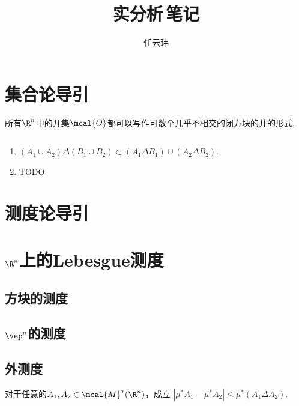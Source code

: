 

\title{实分析$\,$笔记}
\author{任云玮}
\date{}



\maketitle
\tableofcontents
\newpage

\section{集合论导引}

  \begin{thm}
    \label{thm: 开集的闭方块表示}
    所有$\R^n$中的开集$\mcal{O}$都可以写作可数个几乎不相交的闭方块的并的形式.
  \end{thm}

  \begin{pos}[对称差]
    \label{pos: 对称差}
    $\,$
    \begin{enumerate}
      \item $(A_1\cup A_2)\Delta(B_1\cup B_2)\subset(A_1\Delta B_1)\cup(A_2\Delta B_2)$.
      \item TODO
    \end{enumerate}
  \end{pos}

\newpage
\section{测度论导引}

\newpage
\section{$\R^n$上的Lebesgue测度}

\subsection{方块的测度}

\subsection{$\vep^n$的测度}

\subsection{外测度}

  \begin{lemma}
    对于任意的$A_1,A_2\in\mcal{M}^*(\R^n)$，成立
    $|\mu^*A_1 - \mu^*A_2|\le\mu^*(A_1\Delta A_2)$.
  \end{lemma}

